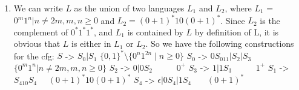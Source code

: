\documentclass[11pt]{article}
\begin{document}
\begin{solution}
\begin{enumerate}
\item
We can write $L$ as the union of two languages $L_1$ and $L_2$,
\newline where $L_1$ = ${0^m1^n | n \neq 2m, m, n \ge 0}$ and $L_2 = (0+1)^*10(0+1)^*$. Since $L_2$ is the complement of $0^*1^*1^*$, and $L_1$ is contained by $L$ by definition of L, it is obvious that $L$ is either in $L_1$ or $L_2$.
\newline So we have the following constructions for the cfg:
\newline $S$ -> $S_0|S_1$ \indent\indent\indent $\{0,1\}^* \setminus \{ 0^n1^{2n} \mid n \ge 0\}$
\newline $S_0$ -> $0S_011|S_2|S_3$\indent $\{0^m1^n | n \neq 2m, m, n \ge 0\}$
\newline $S_2$ -> $0|0S_2$ \indent\indent \ \ \ \ \ $0^+$
\newline $S_3$ -> $1|1S_3$ \indent\indent \ \ \ \ \ $1^+$
\newline $S_1$ -> $S_410S_4$ \indent\indent \ \ $(0+1)^*10(0+1)^*$
\newline $S_4$ -> $\epsilon|0S_4|1S_4$ \indent \ \ \  $(0+1)^*$


\end{enumerate}

\end{solution}
\end{document}
